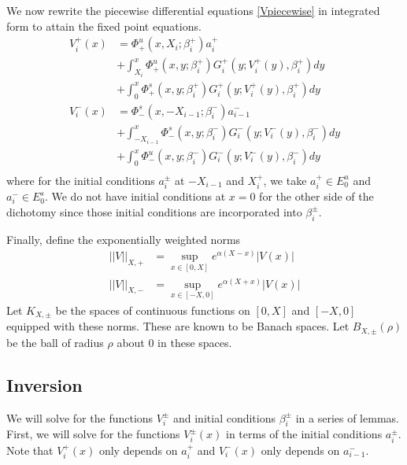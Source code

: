 \documentclass[thesis.tex]{subfiles}
\begin{document}
We now rewrite the piecewise differential equations \eqref{Vpiecewise} in integrated form to attain the fixed point equations.
\begin{equation}\label{FPequations}
\begin{aligned}
V_i^+(x) &= \Phi^u_+(x, X_i; \beta_i^+) a_i^+  \\
&+ \int_{X_i}^x \Phi_+^u(x, y; \beta_i^+) G_i^+(y; V_i^+(y),\beta_i^+)dy \\
&+ \int_0^x \Phi_+^s(x, y; \beta_i^+) G_i^+(y; V_i^+(y),\beta_i^+)dy \\ 
V_i^-(x) &= \Phi^s_-(x, -X_{i-1}; \beta_i^-) a_{i-1}^-  \\
&+ \int_{-X_{i-1}}^x \Phi_-^s(x, y; \beta_i^-) G_i^-(y; V_i^-(y),\beta_i^-)dy \\
&+ \int_0^x \Phi_-^u(x, y; \beta_i^-) G_i^-(y; V_i^-(y),\beta_i^-)dy \\
\end{aligned}
\end{equation}
where for the initial conditions $a_i^\pm$ at $-X_{i-1}$ and $X_i^+$, we take $a_i^+ \in E_0^u$ and $a_i^- \in E_0^s$. We do not have initial conditions at $x = 0$ for the other side of the dichotomy since those initial conditions are incorporated into $\beta_i^\pm$.

Finally, define the exponentially weighted norms
\begin{equation}\label{expwtnorm}
\begin{aligned}
||V||_{X, +} &= \sup_{x \in [0, X]} e^{\alpha(X - x)}|V(x)| \\
||V||_{X, -} &= \sup_{x \in [-X, 0]} e^{\alpha(X + x)}|V(x)|
\end{aligned}
\end{equation}
Let $K_{X, \pm}$ be the spaces of continuous functions on $[0, X]$ and $[-X, 0]$ equipped with these norms. These are known to be Banach spaces. Let $B_{X, \pm}(\rho)$ be the ball of radius $\rho$ about $0$ in these spaces.

\subsection{Inversion}

We will solve for the functions $V_i^\pm$ and initial conditions $\beta_i^\pm$ in a series of lemmas. First, we will solve for the functions $V_i^\pm(x)$ in terms of the initial conditions $a_i^\pm$. Note that $V_i^+(x)$ only depends on $a_i^+$ and $V_i^-(x)$ only depends on $a_{i-1}^-$.

\end{document}
